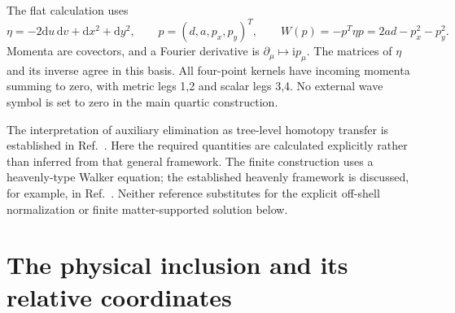 \documentclass[11pt]{article}
\newcommand{\dd}{\mathrm d}
\newcommand{\ii}{\mathrm i}
\begin{document}
The flat calculation uses
\begin{equation}
 \eta=-2\dd u\,\dd v+\dd x^2+\dd y^2,\qquad
 p=(d,a,p_x,p_y)^T,\qquad
 W(p)=-p^T\eta p=2ad-p_x^2-p_y^2.
 \label{eq:flat}
\end{equation}
Momenta are covectors, and a Fourier derivative is \(\partial_\mu\mapsto\ii p_\mu\).
The matrices of \(\eta\) and its inverse agree in this basis.
All four-point kernels have incoming momenta summing to zero, with metric legs 1,2 and scalar legs 3,4.
No external wave symbol is set to zero in the main quartic construction.

The interpretation of auxiliary elimination as tree-level homotopy transfer is established in Ref.~\cite{Arvanitakis2020}.
Here the required quantities are calculated explicitly rather than inferred from that general framework.
The finite construction uses a heavenly-type Walker equation; the established heavenly framework is discussed, for example, in Ref.~\cite{Krasnov2024}.
Neither reference substitutes for the explicit off-shell normalization or finite matter-supported solution below.

\section{The physical inclusion and its relative coordinates}
\label{sec:inclusion}
\end{document}
